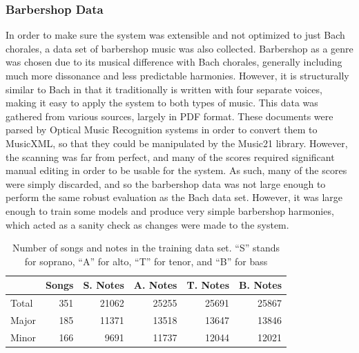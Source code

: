 \documentclass{sig-alternate}
\begin{document}
\subsubsection{Barbershop Data}
In order to make sure the system was extensible and not optimized to just Bach chorales, a data set of barbershop music was also collected. Barbershop as a genre was chosen due to its musical difference with Bach chorales, generally including much more dissonance and less predictable harmonies. However, it is structurally similar to Bach in that it traditionally is written with four separate voices, making it easy to apply the system to both types of music. This data was gathered from various sources, largely in PDF format. These documents were parsed by Optical Music Recognition systems in order to convert them to MusicXML, so that they could be manipulated by the Music21 library. However, the scanning was far from perfect, and many of the scores required significant manual editing in order to be usable for the system. As such, many of the scores were simply discarded, and so the barbershop data was not large enough to perform the same robust evaluation as the Bach data set. However, it was large enough to train some models and produce very simple barbershop harmonies, which acted as a sanity check as changes were made to the system.

\begin{table}
  \begin{center}
      \begin{tabular}{| l | r | r | r | r | r |}
      \hline
       \  & Songs & S. Notes & A. Notes & T. Notes & B. Notes \\ \hline
       Total &  351 & 21062 & 25255 & 25691 & 25867 \\ 
       Major &  185 & 11371 & 13518 & 13647 & 13846 \\ 
       Minor & 166 & 9691 & 11737 & 12044 & 12021  \\ \hline
      \end{tabular}
  \end{center}
  \caption{Number of songs and notes in the training data set. ``S'' stands for soprano, ``A'' for alto, ``T'' for tenor, and ``B'' for bass}
\end{table}
\end{document}

